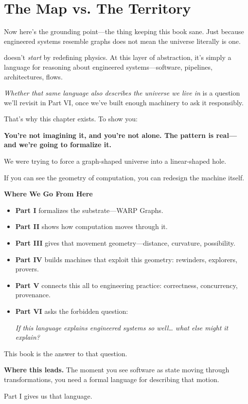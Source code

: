 \section*{The Map vs. The Territory}

Now here’s the grounding point—the thing keeping this book sane.  
Just because engineered systems resemble graphs does not mean the universe literally is one.

\COMPUTER{} doesn’t \textit{start} by redefining physics.  
At this layer of abstraction, it's simply a language for reasoning about engineered systems—software, pipelines, architectures, flows.  

\textit{Whether that same language also describes the universe we live in}  
is a question we’ll revisit in Part VI, once we've built enough machinery to ask it responsibly.

That’s why this chapter exists.  
To show you:

\begin{center}
\textbf{You're not imagining it, and you're not alone.  
The pattern is real—and we're going to formalize it.}
\end{center}

We were trying to force a graph-shaped universe into a linear-shaped hole.

If you can see the geometry of computation, you can redesign the machine itself.

\medskip

\noindent\textbf{Where We Go From Here}

\begin{itemize}
    \item \textbf{Part I} formalizes the substrate—WARP Graphs.
    \item \textbf{Part II} shows how computation moves through it.
    \item \textbf{Part III} gives that movement geometry—distance, curvature, possibility.
    \item \textbf{Part IV} builds machines that exploit this geometry: rewinders, explorers, provers.
    \item \textbf{Part V} connects this all to engineering practice: correctness, concurrency, provenance.
    \item \textbf{Part VI} asks the forbidden question:
    
    \begin{center}
    \textit{If this language explains engineered systems so well…  
    what else might it explain?}
    \end{center}
\end{itemize}

This book is the answer to that question.

\bigskip

\noindent\textbf{Where this leads.}  
The moment you see software as state moving through transformations,  
you need a formal language for describing that motion.

Part I gives us that language.
